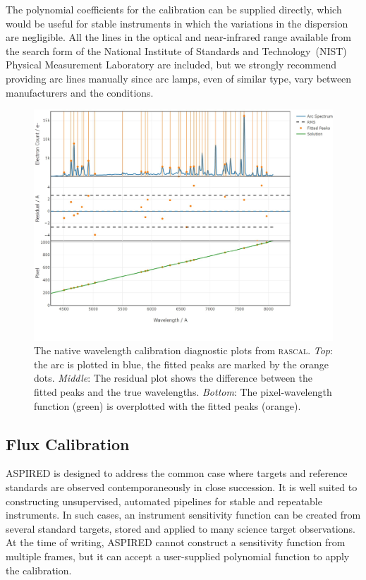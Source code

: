 \documentclass[linenumbers, twocolumn]{aastex631}
\begin{document}
The polynomial coefficients for the calibration can be supplied directly,
which would be useful for stable instruments in which the variations in the
dispersion are negligible. All the lines in the optical and near-infrared range
available from the search form of the National Institute of Standards and
Technology~(NIST) Physical Measurement Laboratory are included, but we strongly
recommend providing arc lines manually since arc lamps, even of similar type,
vary between manufacturers and the conditions.

\begin{figure}
    \centering
    \includegraphics[width=\columnwidth]{fig_05_wavelength_calibration_diagnostics.pdf}
    \caption{The native wavelength calibration diagnostic plots from \textsc{rascal}.
    \textit{Top}: the arc is plotted in blue, the fitted peaks are marked by
    the orange dots. \textit{Middle}: The residual plot shows the difference
    between the fitted peaks and the true wavelengths. \textit{Bottom}: The
    pixel-wavelength function (green) is overplotted with the fitted
    peaks (orange).}
    \label{fig:wavecal}
\end{figure}

\subsection{Flux Calibration}
\textsc{ASPIRED} is designed to address the common case where targets and
reference standards are observed contemporaneously in close succession. It is
well suited to constructing unsupervised, automated pipelines for stable and
repeatable instruments. In such cases, an instrument sensitivity function can be
created from several standard targets, stored and applied to many science target
observations. At the time of writing, \textsc{ASPIRED} cannot construct a
sensitivity function from multiple frames, but it can accept a user-supplied
polynomial function to apply the calibration.
 
\end{document}
